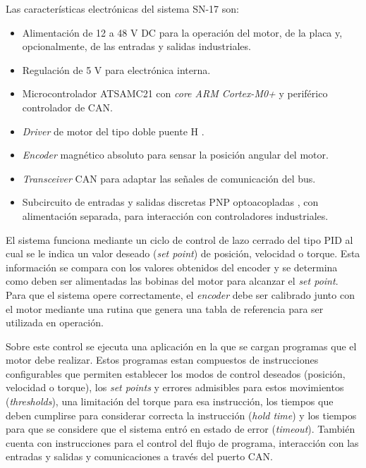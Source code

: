 
\newpage

Las características electrónicas del sistema SN-17 son:

\begin{itemize}
	\item Alimentación de 12 a 48 V DC para la operación del motor, de la placa y, opcionalmente, de las entradas y salidas industriales.
	\item Regulación de 5 V para electrónica interna.
	\item Microcontrolador ATSAMC21 \citep{web_ATSAMC21G18A} con \textit{core ARM Cortex-M0+} y periférico controlador de CAN.
	\item \textit{Driver} de motor del tipo doble puente H \citep{web_A4954}.
	\item \textit{Encoder} magnético absoluto \citep{web_AS5047D} para sensar la posición angular del motor.
	\item \textit{Transceiver} CAN para adaptar las señales de comunicación del bus.
	\item Subcircuito de entradas y salidas discretas PNP optoacopladas \citep{web_optoacopladores_LTV}, con alimentación separada, para interacción con controladores industriales.
\end{itemize}

El sistema funciona mediante un ciclo de control de lazo cerrado del tipo PID \citep{paper_PID_steppers} al cual se le indica un valor deseado (\textit{set point}) de posición, velocidad o torque. Esta información se compara con los valores obtenidos del encoder y se determina como deben ser alimentadas las bobinas del motor para alcanzar el \textit{set point}. Para que el sistema opere correctamente, el \textit{encoder} debe ser calibrado junto con el motor mediante una rutina que genera una tabla de referencia para ser utilizada en operación.

Sobre este control se ejecuta una aplicación en la que se cargan programas que el motor debe realizar. Estos programas estan compuestos de instrucciones configurables que permiten establecer los modos de control deseados (posición, velocidad o torque), los \textit{set points} y errores admisibles para estos movimientos (\textit{thresholds}), una limitación del torque para esa instrucción, los tiempos que deben cumplirse para considerar correcta la instrucción (\textit{hold time}) y los tiempos para que se considere que el sistema entró en estado de error (\textit{timeout}). También cuenta con instrucciones para el control del flujo de programa, interacción con las entradas y salidas y comunicaciones a través del puerto CAN.

